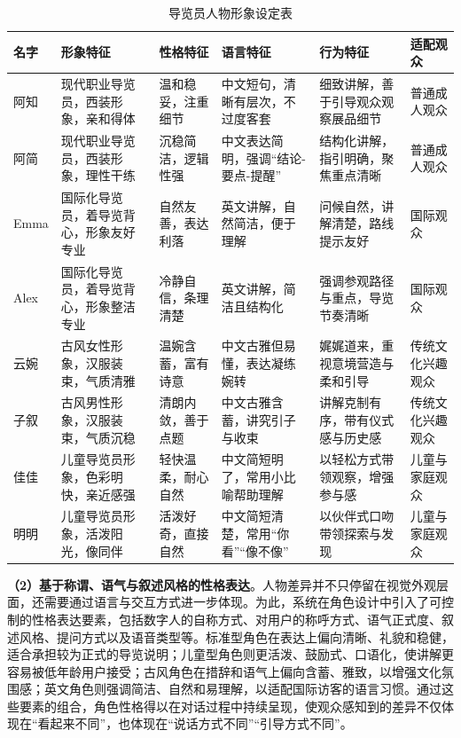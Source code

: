 \begin{table}[htbp]
\centering
\caption{导览员人物形象设定表}
\label{tab:guide-personas}
\renewcommand{\arraystretch}{1.2}
\setlength{\tabcolsep}{4pt}
\footnotesize
\begin{tabularx}{\textwidth}{>{\raggedright\arraybackslash}p{1.1cm} >{\raggedright\arraybackslash}p{2.8cm} >{\raggedright\arraybackslash}p{2.1cm} >{\raggedright\arraybackslash}p{2.5cm} >{\raggedright\arraybackslash}p{2.6cm} >{\raggedright\arraybackslash}X}
\toprule
名字 & 形象特征 & 性格特征 & 语言特征 & 行为特征 & 适配观众 \\
\midrule
阿知 & 现代职业导览员，西装形象，亲和得体 & 温和稳妥，注重细节 & 中文短句，清晰有层次，不过度客套 & 细致讲解，善于引导观众观察展品细节 & 普通成人观众 \\
阿简 & 现代职业导览员，西装形象，理性干练 & 沉稳简洁，逻辑性强 & 中文表达简明，强调“结论-要点-提醒” & 结构化讲解，指引明确，聚焦重点清晰 & 普通成人观众 \\
Emma & 国际化导览员，着导览背心，形象友好专业 & 自然友善，表达利落 & 英文讲解，自然简洁，便于理解 & 问候自然，讲解清楚，路线提示友好 & 国际观众 \\
Alex & 国际化导览员，着导览背心，形象整洁专业 & 冷静自信，条理清楚 & 英文讲解，简洁且结构化 & 强调参观路径与重点，导览节奏清晰 & 国际观众 \\
云婉 & 古风女性形象，汉服装束，气质清雅 & 温婉含蓄，富有诗意 & 中文古雅但易懂，表达凝练婉转 & 娓娓道来，重视意境营造与柔和引导 & 传统文化兴趣观众 \\
子叙 & 古风男性形象，汉服装束，气质沉稳 & 清朗内敛，善于点题 & 中文古雅含蓄，讲究引子与收束 & 讲解克制有序，带有仪式感与历史感 & 传统文化兴趣观众 \\
佳佳 & 儿童导览员形象，色彩明快，亲近感强 & 轻快温柔，耐心自然 & 中文简短明了，常用小比喻帮助理解 & 以轻松方式带领观察，增强参与感 & 儿童与家庭观众 \\
明明 & 儿童导览员形象，活泼阳光，像同伴 & 活泼好奇，直接自然 & 中文简短清楚，常用“你看”“像不像” & 以伙伴式口吻带领探索与发现 & 儿童与家庭观众 \\
\bottomrule
\end{tabularx}
\end{table}

\textbf{（2）基于称谓、语气与叙述风格的性格表达}。人物差异并不只停留在视觉外观层面，还需要通过语言与交互方式进一步体现。为此，系统在角色设计中引入了可控制的性格表达要素，包括数字人的自称方式、对用户的称呼方式、语气正式度、叙述风格、提问方式以及语音类型等。标准型角色在表达上偏向清晰、礼貌和稳健，适合承担较为正式的导览说明；儿童型角色则更活泼、鼓励式、口语化，使讲解更容易被低年龄用户接受；古风角色在措辞和语气上偏向含蓄、雅致，以增强文化氛围感；英文角色则强调简洁、自然和易理解，以适配国际访客的语言习惯。通过这些要素的组合，角色性格得以在对话过程中持续呈现，使观众感知到的差异不仅体现在“看起来不同”，也体现在“说话方式不同”“引导方式不同”。

